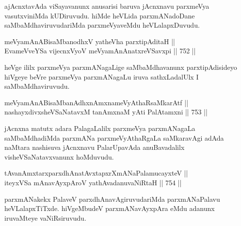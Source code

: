 \begin{artha} 
ajAcnxtavAda viSayavanunx anusarisi baruva jAcnxnavu parxmeVya vasutxviniMda kUDiruvudu. hiMde heVLida parxmANadoDane saMbaMdhaviruvudariMda parxmeVyaveMdu heVLalapxDuvudu.
\end{artha}


\begin{shl}
meVyamAnABisaMbanodhxV yatheVha parxtipAditaH || \\
EvameVveYSa vijecnxVyoV meVyamAnAnatxreVSavxpi \hfill || 752 ||  
\end{shl}

\begin{artha} 
heVge ililx parxmeVya parxmANagaLige saMbaMdhavanunx parxtipAdisideyo hiVgeye beVre parxmeVya parxmANagaLu iruva sathxLadalUlx I saMbaMdhaviruvudu. 
\end{artha}

\begin{shl}
meVyamAnABisaMbanAdhxnAmxnameVyAthaRsaMkarAtf ||  \\
nashayxdivxsheVSaNatavxM tanAmxnaM yAti PalAtamxni \hfill || 753 ||  
\end{shl}

\begin{artha} 
jAcnxna matutx adara PalagaLalilx parxmeVya parxmANagaLa saMbaMdhadiMda parxmANa parxmeVyAthaRgaLa saMkaravAgi adAda naMtara nashisuva jAcnxnavu PalarUpavAda anuBavadalilx visheVSaNatavxvanunx hoMduvudu.
\end{artha}

\begin{shl}
tAvanAmxtarxparxdhAnatAvxtapxrXmANaPalamucayxteV || \\
iteyxVSa mAnavAyxpAroV yathAvadanuvaNiRtaH \hfill || 754 ||  
\end{shl}

\begin{artha} 
parxmANakekx PalaveV parxdhAnavAgiruvudariMda parxmANaPalavu heVLalapxTiTxde. hiVgeMbudeV parxmANavAyxpAra eMdu adanunx iruvaMteye vaNiRsiruvudu.
\end{artha}


